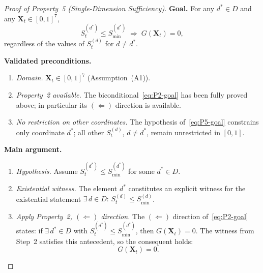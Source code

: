 \documentclass[12pt,openany]{book}
\numberwithin{equation}{chapter}
\theoremstyle{plain}
\theoremstyle{definition}
\theoremstyle{remark}
\def\mathcal#1{#1}%
\begin{document}
\begin{proof}[Proof of Property~5 (Single-Dimension Sufficiency)]
\textbf{Goal.}  For any $d^*\in\mathcal{D}$ and any
$\mathbf{X}_t\in[0,1]^7$,
\begin{equation}
  \mathcal{S}_t^{(d^*)} \leq \mathcal{S}_{\min}^{(d^*)}
  \;\Longrightarrow\;
  G(\mathbf{X}_t) = 0,
  \label{eq:P5-goal}
\end{equation}
regardless of the values of
$\mathcal{S}_t^{(d)}$ for $d\neq d^*$.

\medskip\noindent
\textbf{Validated preconditions.}
\begin{enumerate}
  \item \emph{Domain.}
        $\mathbf{X}_t\in[0,1]^7$ (Assumption~(A1)).
  \item \emph{Property~2 available.}
        The biconditional~\eqref{eq:P2-goal} has been
        fully proved above; in particular its
        $(\Leftarrow)$ direction is available.
  \item \emph{No restriction on other coordinates.}
        The hypothesis of~\eqref{eq:P5-goal} constrains
        only coordinate $d^*$; all other
        $\mathcal{S}_t^{(d)}$, $d\neq d^*$, remain
        unrestricted in $[0,1]$.
\end{enumerate}

\medskip\noindent
\textbf{Main argument.}
\begin{enumerate}
  \item \emph{Hypothesis.}
        Assume $\mathcal{S}_t^{(d^*)}\leq
        \mathcal{S}_{\min}^{(d^*)}$ for some
        $d^*\in\mathcal{D}$.

  \item \emph{Existential witness.}
        The element $d^*$ constitutes an explicit witness
        for the existential statement
        $\exists\,d\in\mathcal{D}:\,
         \mathcal{S}_t^{(d)}\leq\mathcal{S}_{\min}^{(d)}$.

  \item \emph{Apply Property~2, $(\Leftarrow)$ direction.}
        The $(\Leftarrow)$ direction
        of~\eqref{eq:P2-goal} states:
        if $\exists\,d^*\in\mathcal{D}$ with
        $\mathcal{S}_t^{(d^*)}\leq\mathcal{S}_{\min}^{(d^*)}$,
        then $G(\mathbf{X}_t)=0$.
        The witness from Step~2 satisfies this antecedent,
        so the consequent holds:
        \begin{equation}
          G(\mathbf{X}_t) = 0.
          \label{eq:P5-result}
        \end{equation}


\end{enumerate}
\end{proof}
\end{document}

